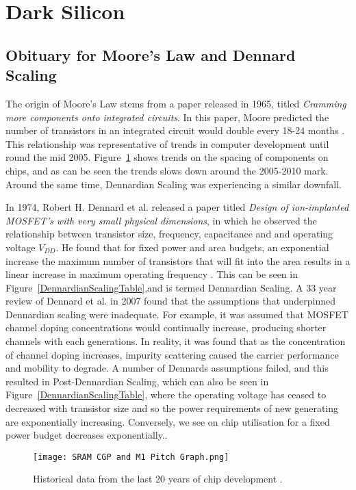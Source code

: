 	
	\section{Dark Silicon}
		\subsection{Obituary for Moore’s Law and Dennard Scaling}
			The origin of Moore's Law stems from a paper released in 1965, titled \textit{Cramming more components onto integrated circuits}. In this paper, Moore predicted the number of transistors in an integrated circuit would double every 18-24 months \cite{BookOfMoore}. This relationship was representative of trends in computer development until round the mid 2005. Figure~\ref{SRAMGraph} shows trends on the spacing of components on chips, and as can be seen the trends slows down around the 2005-2010 mark.	Around the same time, Dennardian Scaling was experiencing a similar downfall.
			
			In 1974, Robert H. Dennard et al. released a paper titled \textit{Design of ion-implanted MOSFET's with very small physical dimensions}, in which he observed the relationship between transistor size, frequency, capacitance and and operating voltage $V_{DD}$. He found that for fixed power and area budgets, an exponential increase the maximum number of transistors that will fit into the area results in a linear increase in maximum operating frequency \cite{SmallDimensionMosfets}. This can be seen in Figure~\ref{DennardianScalingTable},and is termed Dennardian Scaling. A 33 year review of Dennard et al. in 2007 found that the assumptions that underpinned Dennardian scaling were inadequate. For example, it was assumed that MOSFET channel doping concentrations would continually increase, producing shorter channels with each generations. In reality, it was found that as the concentration of channel doping increases, impurity scattering caused the carrier performance and mobility to degrade. A number of Dennards assumptions failed, and this resulted in Post-Dennardian Scaling, which can also be seen in Figure~\ref{DennardianScalingTable}, where the operating voltage has ceased to decreased with transistor size and so the power requirements of new generating are exponentially increasing. Conversely, we see on chip utilisation for a fixed power budget decreases exponentially.\cite{ReviewOfDennard}.
			

			\begin{figure}

				\begin{center}
					\texttt{[image: SRAM CGP and M1 Pitch Graph.png]}
				
				\caption{Historical data from the last 20 years of chip development \cite{TheEndOfMooreTheis}.}
				\end{center}
				\label{SRAMGraph}
			\end{figure}
		
